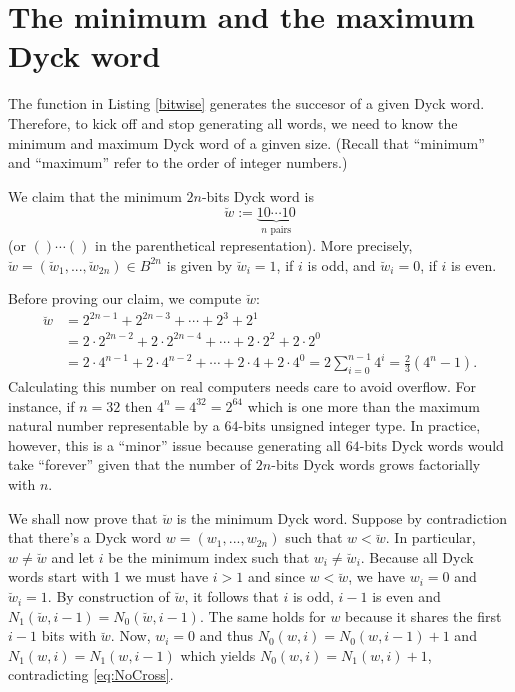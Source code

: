 \documentclass[a4paper]{article}
\begin{document}
\section{The minimum and the maximum Dyck word}

The function in Listing \ref{bitwise} generates the succesor of a given Dyck word.
Therefore, to kick off and stop generating all words, we need to know the minimum and maximum Dyck word of a ginven size.
(Recall that ``minimum'' and ``maximum'' refer to the order of integer numbers.)

We claim that the minimum $2n$-bits Dyck word is
\[
\breve w := \underbrace{10\cdots10}_{n\text{ pairs}}
\]
(or $()\cdots()$ in the parenthetical representation).
More precisely, $\breve w = (\breve w_1, ..., \breve w_{2n})\in B^{2n}$ is given by $\breve w_i = 1$, if $i$ is odd, and $\breve w_i = 0$, if $i$ is even.

Before proving our claim, we compute $\breve w$:
\begin{align*}
\breve w &= 2^{2n - 1} + 2^{2n - 3} + \cdots + 2^3 + 2^1 \\
&= 2 \cdot 2^{2n - 2} + 2\cdot 2^{2n - 4} + \cdots + 2\cdot 2^2 + 2\cdot 2^0 \\
&= 2\cdot 4^{n - 1} + 2\cdot 4^{n - 2} + \cdots + 2\cdot 4 + 2\cdot 4^0 = 2\sum_{i = 0}^{n - 1}4^i = \frac23(4^n - 1).
\end{align*}
Calculating this number on real computers needs care to avoid overflow.
For instance, if $n = 32$ then $4^n = 4^{32} = 2^{64}$ which is one more than the maximum natural number representable by a $64$-bits unsigned integer type.
In practice, however, this is a ``minor'' issue because generating all $64$-bits Dyck words would take ``forever'' given that the number of $2n$-bits Dyck words grows factorially \cite{Wikipedia-Catalan} with $n$.

We shall now prove that $\breve w$ is the minimum Dyck word.
Suppose by contradiction that there's a Dyck word $w = (w_1, ..., w_{2n})$ such that $w < \breve w$.
In particular, $w \ne \breve w$ and let $i$ be the minimum index such that $w_i \ne \breve w_i$.
Because all Dyck words start with 1 we must have $i > 1$ and since $w < \breve w$, we have $w_i = 0$ and $\breve w_i = 1$.
By construction of $\breve w$, it follows that $i$ is odd, $i - 1$ is even and $N_1(\breve w, i - 1) = N_0(\breve w, i - 1)$.
The same holds for $w$ because it shares the first $i - 1$ bits with $\breve w$.
Now, $w_i = 0$ and thus  $N_0(w, i) = N_0(w, i - 1) + 1$ and $N_1(w, i) = N_1(w, i - 1)$ which yields $N_0(w, i) = N_1(w, i) + 1$, contradicting \eqref{eq:NoCross}.
\end{document}
